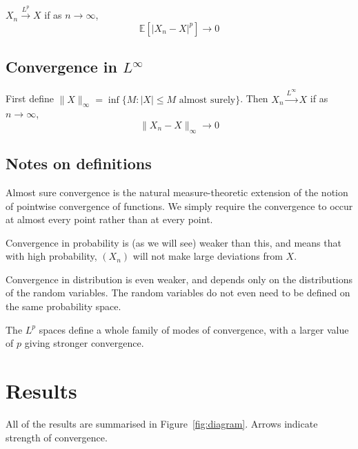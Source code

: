 \documentclass{article}
\begin{document}
$X_n \xrightarrow{L^p} X$
if as $n \to \infty$,
$$\mathbb{E}[|X_n - X|^p] \to 0$$

\subsection*{Convergence in $L^\infty$}

First define $\|X\|_\infty = \inf\{M: |X| \leq M \text{ almost surely}\}$.
Then $X_n \xrightarrow{L^\infty} X$
if as $n \to \infty$,
$$\|X_n - X\|_\infty \to 0$$

\subsection*{Notes on definitions}

Almost sure convergence is the natural measure-theoretic extension of the
notion of pointwise convergence of functions.
We simply require the convergence to occur at almost every point rather
than at every point.

Convergence in probability is (as we will see) weaker than this, and means that
with high probability, $(X_n)$ will not make large deviations from $X$.

Convergence in distribution is even weaker, and depends only on the
distributions of the random variables.
The random variables do not even need to be defined on the same probability space.

The $L^p$ spaces define a whole family of modes of convergence, with a larger value of $p$ giving
stronger convergence.


\section{Results}

All of the results are summarised in Figure~\ref{fig:diagram}.
Arrows indicate strength of convergence.
\end{document}
